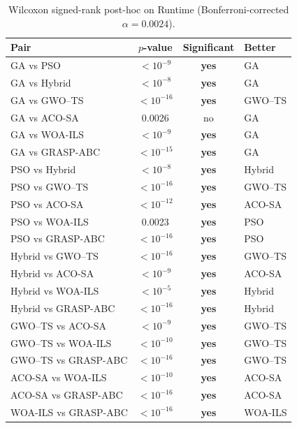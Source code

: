 \begin{table}[t]
  \centering
  \caption{Wilcoxon signed-rank post-hoc on Runtime (Bonferroni-corrected $\alpha = 0.0024$).}
  \label{tab:posthoc_runtime_sec}
  \begin{tabular}{@{}l c c l@{}}
    \toprule
    \textbf{Pair} & \textbf{$p$-value} & \textbf{Significant} & \textbf{Better} \\
    \midrule
    GA vs PSO & $<10^{-9}$ & \textbf{yes} & GA \\
    GA vs Hybrid & $<10^{-8}$ & \textbf{yes} & GA \\
    GA vs GWO--TS & $<10^{-16}$ & \textbf{yes} & GWO--TS \\
    GA vs ACO-SA & 0.0026 & no & GA \\
    GA vs WOA-ILS & $<10^{-9}$ & \textbf{yes} & GA \\
    GA vs GRASP-ABC & $<10^{-15}$ & \textbf{yes} & GA \\
    PSO vs Hybrid & $<10^{-8}$ & \textbf{yes} & Hybrid \\
    PSO vs GWO--TS & $<10^{-16}$ & \textbf{yes} & GWO--TS \\
    PSO vs ACO-SA & $<10^{-12}$ & \textbf{yes} & ACO-SA \\
    PSO vs WOA-ILS & 0.0023 & \textbf{yes} & PSO \\
    PSO vs GRASP-ABC & $<10^{-16}$ & \textbf{yes} & PSO \\
    Hybrid vs GWO--TS & $<10^{-16}$ & \textbf{yes} & GWO--TS \\
    Hybrid vs ACO-SA & $<10^{-9}$ & \textbf{yes} & ACO-SA \\
    Hybrid vs WOA-ILS & $<10^{-5}$ & \textbf{yes} & Hybrid \\
    Hybrid vs GRASP-ABC & $<10^{-16}$ & \textbf{yes} & Hybrid \\
    GWO--TS vs ACO-SA & $<10^{-9}$ & \textbf{yes} & GWO--TS \\
    GWO--TS vs WOA-ILS & $<10^{-10}$ & \textbf{yes} & GWO--TS \\
    GWO--TS vs GRASP-ABC & $<10^{-16}$ & \textbf{yes} & GWO--TS \\
    ACO-SA vs WOA-ILS & $<10^{-10}$ & \textbf{yes} & ACO-SA \\
    ACO-SA vs GRASP-ABC & $<10^{-16}$ & \textbf{yes} & ACO-SA \\
    WOA-ILS vs GRASP-ABC & $<10^{-16}$ & \textbf{yes} & WOA-ILS \\
    \bottomrule
  \end{tabular}
\end{table}

